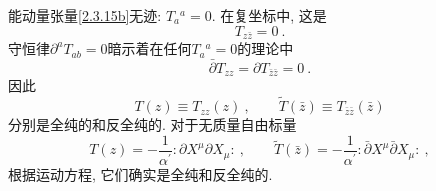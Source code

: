 能动量张量\eqref{2.3.15b}无迹: $T_a{}^a=0$. 在复坐标中, 这是
\begin{equation}
T_{z \bar{z}}=0\:. \label{2.4.1}
\end{equation}
守恒律$\partial^a T_{ab}=0$暗示着在任何$T_a{}^a=0$的理论中
\begin{equation}
\bar{\partial} T_{z z}=\partial T_{\bar{z} \bar{z}}=0 \:. \label{2.4.2}
\end{equation}
因此
\begin{equation}
T(z) \equiv T_{z z}(z)\:, \qquad \tilde{T}(\bar{z}) \equiv T_{\bar{z} \bar{z}}(\bar{z}) \label{2.4.3}
\end{equation}
分别是全纯的和反全纯的. 对于无质量自由标量
\begin{equation}\label{2.4.4}
T(z)=-\frac{1}{\alpha^{\prime}}: \mathrel{\partial X^{\mu} \partial X_{\mu}}: \:, \qquad 
\tilde{T}(\bar{z})=-\frac{1}{\alpha^{\prime}}:\mathrel{ \bar{\partial} X^{\mu} \bar{\partial} X_{\mu}}: \:,
\end{equation}
根据运动方程, 它们确实是全纯和反全纯的.


